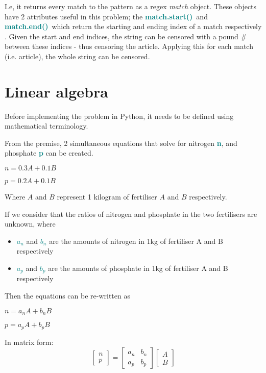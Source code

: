 \documentclass[a4paper]{article}
\newcommand \matchStart {\textcolor{teal}{\textbf{match.start()}}}
\newcommand \matchEnd {\textcolor{teal}{\textbf{match.end()}}}
\begin{document}
I.e, it returns every match to the pattern as a regex \emph{match} object. These objects have 2 attributes useful in this problem; the \matchStart \ and \matchEnd \ which return the starting and ending index of a match respectively \autocite{a2022_re}. Given the start and end indices, the string can be censored with a pound \# between these indices - thus censoring the article. Applying this for each match (i.e. article), the whole string can be censored.


\section{Linear algebra}
Before implementing the problem in Python, it needs to be defined using mathematical terminology.
\vspace{2mm}

\noindent
From the premise, 2 simultaneous equations that solve for nitrogen \textbf{\textcolor{teal}{n}}, and phosphate \textbf{\textcolor{teal}{p}} can be created.
\begin{center} $n=0.3A + 0.1B$ \end{center}
\begin{center} $p=0.2A + 0.1B$ \end{center}
\begin{center} Where $A$ and $B$ represent 1 kilogram of fertiliser $A$ and $B$ respectively. \end{center}

\noindent
If we consider that the ratios of nitrogen and phosphate in the two fertilisers are unknown, where
\begin{itemize}
    \item \textbf{\textcolor{teal}{$a_n$}} and \textbf{\textcolor{teal}{$b_n$}} are the amounts of nitrogen in 1kg of fertiliser A and B respectively
    \item \textbf{\textcolor{teal}{$a_p$}} and \textbf{\textcolor{teal}{$b_p$}} are the amounts of phosphate in 1kg of fertiliser A and B respectively
\end{itemize}
Then the equations can be re-written as
\begin{center} $n=a_n A + b_n B$ \end{center}
\begin{center} $p=a_p A + b_p B$ \end{center}

\noindent
In matrix form:
\begin{equation*}
    \begin{bmatrix} n \\p \end{bmatrix} =
    \begin{bmatrix} a_n & b_n \\ a_p & b_p \end{bmatrix}
    \begin{bmatrix} A \\ B \end{bmatrix}
\end{equation*}
\end{document}
